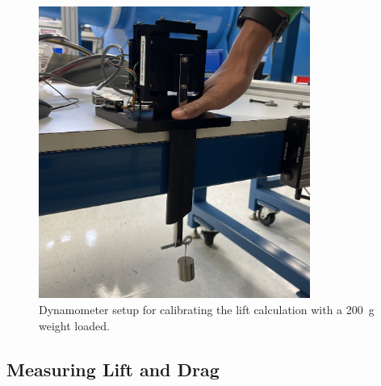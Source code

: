 \documentclass[journal,letterpaper]{IEEEtran}
\begin{document}
\begin{figure}[H]
    \centering
    \includegraphics[width=3.5in]{lift}
    \caption{Dynamometer setup for calibrating the lift calculation with a \qty{200}{\g} weight loaded.}
    \label{fig:lift}
\end{figure}

\subsection{Measuring Lift and Drag}
\end{document}
